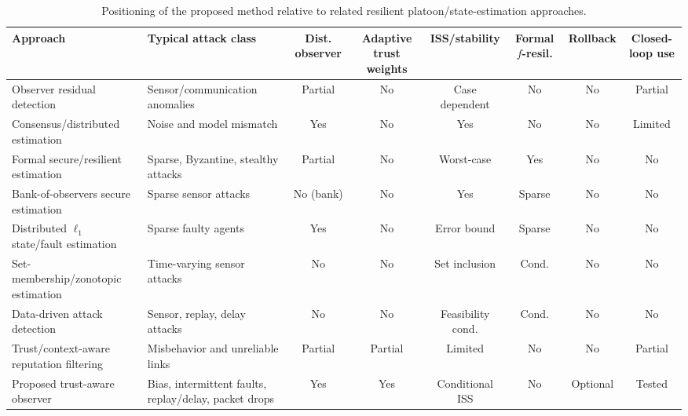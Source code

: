 \documentclass[letterpaper,journal]{IEEEtran}
\begin{document}
\begin{table}[!b]
\centering
\caption{Positioning of the proposed method relative to related resilient platoon/state-estimation approaches. }
\label{tab:related_comparison}
\scriptsize
\setlength{\tabcolsep}{3pt}
\renewcommand{\arraystretch}{0.94}
\begin{tabular}{p{2.45cm}p{2.4cm}cccccc}
\toprule
\textbf{Approach} & \textbf{Typical attack class} & \textbf{Dist. observer} & \textbf{Adaptive trust weights} & \textbf{ISS/stability} & \textbf{Formal $f$-resil.} & \textbf{Rollback} & \textbf{Closed-loop use} \\
\midrule
Observer residual detection~\cite{jeon2020simultaneous,yamamoto2021attack,huang2022detection,2_obs_Angelo} & Sensor/communication anomalies & Partial & No & Case dependent & No & No & Partial \\
Consensus/distributed estimation~\cite{Guitao_multi_mesure,Consensus_discret_Saber,Plug_play} & Noise and model mismatch & Yes & No & Yes & No & No & Limited \\
Formal secure/resilient estimation~\cite{fawzi2014secure,mitra2018byzantine,chong2015observability,pajic2017attack_resilient,khazraei2020attack_auth} & Sparse, Byzantine, stealthy attacks & Partial & No & Worst-case & Yes & No & No \\
Bank-of-observers secure estimation~\cite{chong2021secure} & Sparse sensor attacks & No (bank) & No & Yes & Sparse & No & No \\
Distributed $\ell_1$ state/fault estimation~\cite{hashimoto2020distributed_l1} & Sparse faulty agents & Yes & No & Error bound & Sparse & No & No \\
Set-membership/zonotopic estimation~\cite{niazi2023resilient_set} & Time-varying sensor attacks & No & No & Set inclusion & Cond. & No & No \\
Data-driven attack detection~\cite{coimbatore2025data_driven_attack} & Sensor, replay, delay attacks & No & No & Feasibility cond. & Cond. & No & No \\
Trust/context-aware reputation filtering~\cite{trust_physic_connecte,KF_chisquare_meusure,trust_simple,trust_complex,siddiqui2023trust_vehicles,self-belive,Enhancing_control_trust} & Misbehavior and unreliable links & Partial & Partial & Limited & No & No & Partial \\
Proposed trust-aware observer & Bias, intermittent faults, replay/delay, packet drops & Yes & Yes & Conditional ISS & No & Optional & Tested \\
\bottomrule
\end{tabular}
\end{table}
\end{document}
